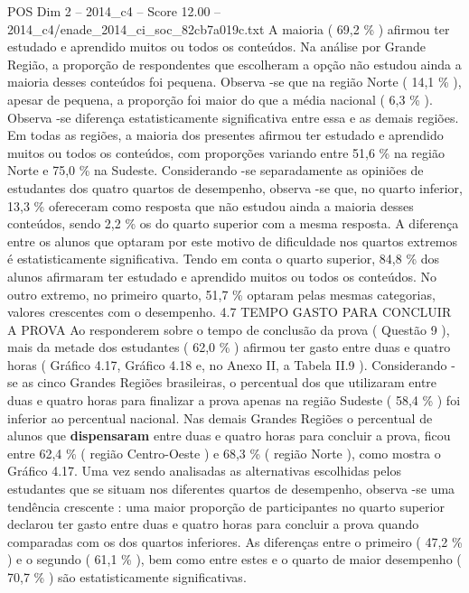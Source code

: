 \begin{textsample}{POS Dim 2 – 2014\_c4 – Score 12.00 – 2014\_c4/enade\_2014\_ci\_soc\_82cb7a019c.txt}
A maioria ( 69,2 \% ) afirmou ter estudado e aprendido muitos ou todos os conteúdos.
Na análise por Grande Região, a proporção de respondentes que escolheram a opção não estudou ainda a maioria desses conteúdos foi pequena.
Observa -se que na região Norte ( 14,1 \% ), apesar de pequena, a proporção foi maior do que a média nacional ( 6,3 \% ).
Observa -se diferença estatisticamente significativa entre essa e as demais regiões.
Em todas as regiões, a maioria dos presentes afirmou ter estudado e aprendido muitos ou todos os conteúdos, com proporções variando entre 51,6 \% na região Norte e 75,0 \% na Sudeste.
Considerando -se separadamente as opiniões de estudantes dos quatro quartos de desempenho, observa -se que, no quarto inferior, 13,3 \% ofereceram como resposta que não estudou ainda a maioria desses conteúdos, sendo 2,2 \% os do quarto superior com a mesma resposta.
A diferença entre os alunos que optaram por este motivo de dificuldade nos quartos extremos é estatisticamente significativa.
Tendo em conta o quarto superior, 84,8 \% dos alunos afirmaram ter estudado e aprendido muitos ou todos os conteúdos.
No outro extremo, no primeiro quarto, 51,7 \% optaram pelas mesmas categorias, valores crescentes com o desempenho. 4.7 TEMPO GASTO PARA CONCLUIR A PROVA Ao responderem sobre o tempo de conclusão da prova ( Questão 9 ), mais da metade dos estudantes ( 62,0 \% ) afirmou ter gasto entre duas e quatro horas ( Gráfico 4.17, Gráfico 4.18 e, no Anexo II, a Tabela II.9 ).
Considerando -se as cinco Grandes Regiões brasileiras, o percentual dos que utilizaram entre duas e quatro horas para finalizar a prova apenas na região Sudeste ( 58,4 \% ) foi inferior ao percentual nacional.
Nas demais Grandes Regiões o percentual de alunos que \textbf{dispensaram} entre duas e quatro horas para concluir a prova, ficou entre 62,4 \% ( região Centro-Oeste ) e 68,3 \% ( região Norte ), como mostra o Gráfico 4.17.
Uma vez sendo analisadas as alternativas escolhidas pelos estudantes que se situam nos diferentes quartos de desempenho, observa -se uma tendência crescente : uma maior proporção de participantes no quarto superior declarou ter gasto entre duas e quatro horas para concluir a prova quando comparadas com os dos quartos inferiores.
As diferenças entre o primeiro ( 47,2 \% ) e o segundo ( 61,1 \% ), bem como entre estes e o quarto de maior desempenho ( 70,7 \% ) são estatisticamente significativas.

\end{textsample}
